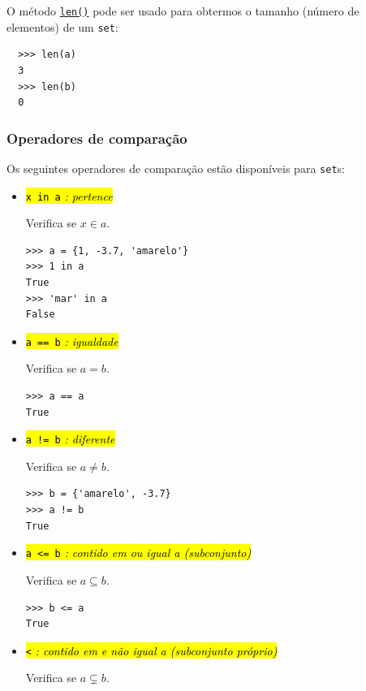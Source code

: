 O método \href{https://docs.python.org/3/library/functions.html#len}{\lstinline+len()+} pode ser usado para obtermos o tamanho (número de elementos) de um \lstinline+set+:
\begin{lstlisting}
  >>> len(a)
  3
  >>> len(b)
  0
\end{lstlisting}

\subsubsection{Operadores de comparação}\label{cap_lingua_sec_colecao:sssec:opcomp}

Os seguintes operadores de comparação estão disponíveis para \lstinline+set+s:
\begin{itemize}
\item \hl{{\lstinline+x in a+} \emph{: pertence}}

  Verifica se $x\in a$.

\begin{lstlisting}
>>> a = {1, -3.7, 'amarelo'}
>>> 1 in a
True
>>> 'mar' in a
False
\end{lstlisting}

\item \hl{{\lstinline+a == b+} \emph{: igualdade}}

  Verifica se $a = b$.

\begin{lstlisting}
>>> a == a
True
\end{lstlisting}

\item \hl{{\lstinline+a != b+} \emph{: diferente}}

  Verifica se $a \neq b$.

\begin{lstlisting}
>>> b = {'amarelo', -3.7}
>>> a != b
True
\end{lstlisting}
  
\item \hl{{\lstinline+a <= b+} \emph{: contido em ou igual a (subconjunto)}}

  Verifica se $a \subseteq b$.

\begin{lstlisting}
>>> b <= a
True
\end{lstlisting}

\item \hl{{\lstinline+<+} \emph{: contido em e não igual a (subconjunto próprio)}}

  Verifica se $a\subsetneq b$.


\end{itemize}
